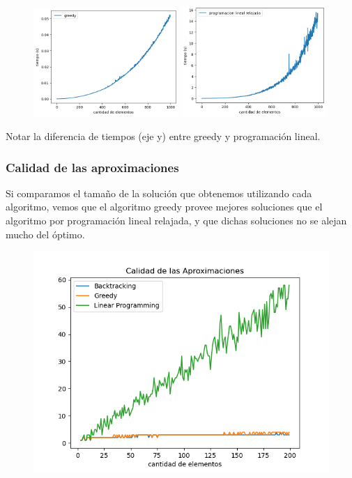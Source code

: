 \begin{figure}[H]
    \centering
    \includegraphics[width=0.49\textwidth]{img/greedy.png}
    \includegraphics[width=0.49\textwidth]{img/pl_rlx.png}
\end{figure}

Notar la diferencia de tiempos (eje y) entre greedy y programación lineal.

\subsubsection{Calidad de las aproximaciones}

Si comparamos el tamaño de la solución que obtenemos utilizando cada algoritmo,
vemos que el algoritmo greedy provee mejores soluciones que el algoritmo por
programación lineal relajada, y que dichas soluciones no se alejan mucho del
óptimo.

\begin{figure}[H]
    \centering
    \includegraphics[width=1\textwidth]{img/quality.png}
\end{figure}

